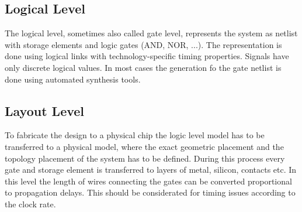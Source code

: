 \subsection{Logical Level}
The logical level, sometimes also called gate level, represents the system as netlist with storage elements and logic gates (AND, NOR, ...). The representation is done using logical links with technology-specific timing properties. Signals have only discrete logical values. In most cases the generation fo the gate netlist is done using automated synthesis tools.
\subsection{Layout Level}
To fabricate the design to a physical chip the logic level model has to be transferred to a physical model, where the exact geometric placement and the topology placement of the system has to be defined. During this process every gate and storage element is transferred to layers of metal, silicon, contacts etc.\cite{Cey96} In this level the length of wires connecting the gates can be converted proportional to propagation delays. This should be considerated for timing issues according to the clock rate.

